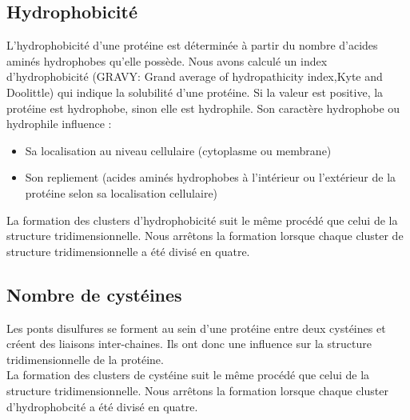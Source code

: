 \subsection*{Hydrophobicité}
L'hydrophobicité d'une protéine est déterminée à partir du nombre d'acides aminés hydrophobes qu'elle possède.
Nous avons calculé un index d'hydrophobicité (GRAVY: Grand average of hydropathicity index,Kyte and Doolittle) qui indique la solubilité d'une protéine. Si la valeur est positive, la protéine est hydrophobe, sinon elle est hydrophile.
Son caractère hydrophobe ou hydrophile influence :
\begin{itemize}
\item Sa localisation au niveau cellulaire (cytoplasme ou membrane)
\item Son repliement (acides aminés hydrophobes à l'intérieur ou l'extérieur de la protéine selon sa localisation cellulaire) 
\end{itemize}
La formation des clusters d'hydrophobicité suit le m\^eme procédé que celui de la structure tridimensionnelle. Nous arr\^etons la formation lorsque chaque cluster de structure tridimensionnelle a été divisé en quatre.

\subsection*{Nombre de cystéines}
Les ponts disulfures se forment au sein d'une protéine entre deux cystéines et créent des liaisons inter-chaines. Ils ont donc une influence sur la structure tridimensionnelle de la protéine.\\
La formation des clusters de cystéine suit le m\^eme procédé que celui de la structure tridimensionnelle. Nous arr\^etons la formation lorsque chaque cluster d'hydrophobcité a été divisé en quatre.

